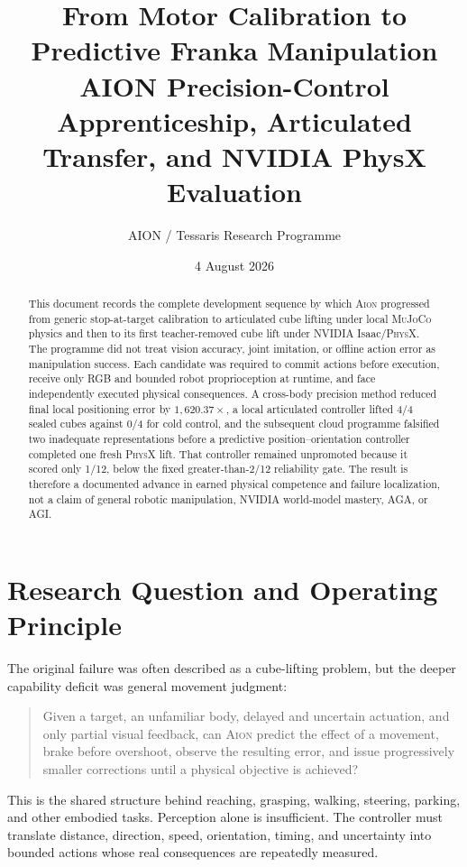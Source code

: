 \documentclass[11pt,a4paper]{article}
\title{From Motor Calibration to Predictive Franka Manipulation\\
\large AION Precision-Control Apprenticeship, Articulated Transfer, and NVIDIA PhysX Evaluation}
\author{AION / Tessaris Research Programme}
\date{4 August 2026}
\newcommand{\AION}{\textsc{Aion}}
\newcommand{\PhysX}{\textsc{PhysX}}
\newcommand{\MuJoCo}{\textsc{MuJoCo}}
\begin{document}
\maketitle

\begin{abstract}
This document records the complete development sequence by which \AION{}
progressed from generic stop-at-target calibration to articulated cube lifting
under local \MuJoCo{} physics and then to its first teacher-removed cube lift
under NVIDIA Isaac/\PhysX{}.  The programme did not treat vision accuracy,
joint imitation, or offline action error as manipulation success.  Each
candidate was required to commit actions before execution, receive only RGB
and bounded robot proprioception at runtime, and face independently executed
physical consequences.  A cross-body precision method reduced final local
positioning error by $1{,}620.37\times$, a local articulated controller lifted
4/4 sealed cubes against 0/4 for cold control, and the subsequent cloud
programme falsified two inadequate representations before a predictive
position--orientation controller completed one fresh \PhysX{} lift.  That
controller remained unpromoted because it scored only 1/12, below the fixed
greater-than-2/12 reliability gate.  The result is therefore a documented
advance in earned physical competence and failure localization, not a claim of
general robotic manipulation, NVIDIA world-model mastery, AGA, or AGI.
\end{abstract}

\section{Research Question and Operating Principle}

The original failure was often described as a cube-lifting problem, but the
deeper capability deficit was general movement judgment:

\begin{quote}
Given a target, an unfamiliar body, delayed and uncertain actuation, and only
partial visual feedback, can \AION{} predict the effect of a movement, brake
before overshoot, observe the resulting error, and issue progressively smaller
corrections until a physical objective is achieved?
\end{quote}

This is the shared structure behind reaching, grasping, walking, steering,
parking, and other embodied tasks.  Perception alone is insufficient.  The
controller must translate distance, direction, speed, orientation, timing, and
uncertainty into bounded actions whose real consequences are repeatedly
measured.
\end{document}
